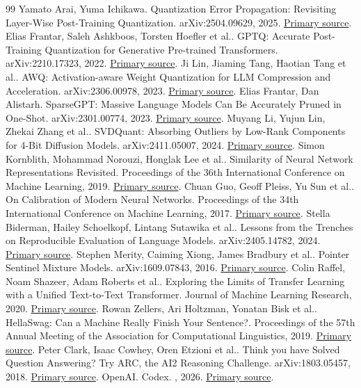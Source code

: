 \documentclass[conference]{IEEEtran}
\begin{document}
\begin{thebibliography}{99}
 Yamato Arai, Yuma Ichikawa. Quantization Error Propagation: Revisiting Layer-Wise Post-Training Quantization. arXiv:2504.09629, 2025. \href{https://arxiv.org/abs/2504.09629}{Primary source}.
 Elias Frantar, Saleh Ashkboos, Torsten Hoefler et al.. GPTQ: Accurate Post-Training Quantization for Generative Pre-trained Transformers. arXiv:2210.17323, 2022. \href{https://arxiv.org/abs/2210.17323}{Primary source}.
 Ji Lin, Jiaming Tang, Haotian Tang et al.. AWQ: Activation-aware Weight Quantization for LLM Compression and Acceleration. arXiv:2306.00978, 2023. \href{https://arxiv.org/abs/2306.00978}{Primary source}.
 Elias Frantar, Dan Alistarh. SparseGPT: Massive Language Models Can Be Accurately Pruned in One-Shot. arXiv:2301.00774, 2023. \href{https://arxiv.org/abs/2301.00774}{Primary source}.
 Muyang Li, Yujun Lin, Zhekai Zhang et al.. SVDQuant: Absorbing Outliers by Low-Rank Components for 4-Bit Diffusion Models. arXiv:2411.05007, 2024. \href{https://arxiv.org/abs/2411.05007}{Primary source}.
 Simon Kornblith, Mohammad Norouzi, Honglak Lee et al.. Similarity of Neural Network Representations Revisited. Proceedings of the 36th International Conference on Machine Learning, 2019. \href{https://proceedings.mlr.press/v97/kornblith19a.html}{Primary source}.
 Chuan Guo, Geoff Pleiss, Yu Sun et al.. On Calibration of Modern Neural Networks. Proceedings of the 34th International Conference on Machine Learning, 2017. \href{https://proceedings.mlr.press/v70/guo17a.html}{Primary source}.
 Stella Biderman, Hailey Schoelkopf, Lintang Sutawika et al.. Lessons from the Trenches on Reproducible Evaluation of Language Models. arXiv:2405.14782, 2024. \href{https://arxiv.org/abs/2405.14782}{Primary source}.
 Stephen Merity, Caiming Xiong, James Bradbury et al.. Pointer Sentinel Mixture Models. arXiv:1609.07843, 2016. \href{https://arxiv.org/abs/1609.07843}{Primary source}.
 Colin Raffel, Noam Shazeer, Adam Roberts et al.. Exploring the Limits of Transfer Learning with a Unified Text-to-Text Transformer. Journal of Machine Learning Research, 2020. \href{https://jmlr.org/papers/v21/20-074.html}{Primary source}.
 Rowan Zellers, Ari Holtzman, Yonatan Bisk et al.. HellaSwag: Can a Machine Really Finish Your Sentence?. Proceedings of the 57th Annual Meeting of the Association for Computational Linguistics, 2019. \href{https://aclanthology.org/P19-1472/}{Primary source}.
 Peter Clark, Isaac Cowhey, Oren Etzioni et al.. Think you have Solved Question Answering? Try ARC, the AI2 Reasoning Challenge. arXiv:1803.05457, 2018. \href{https://arxiv.org/abs/1803.05457}{Primary source}.
 OpenAI. Codex. , 2026. \href{https://openai.com/codex/}{Primary source}.
\end{thebibliography}
\end{document}
